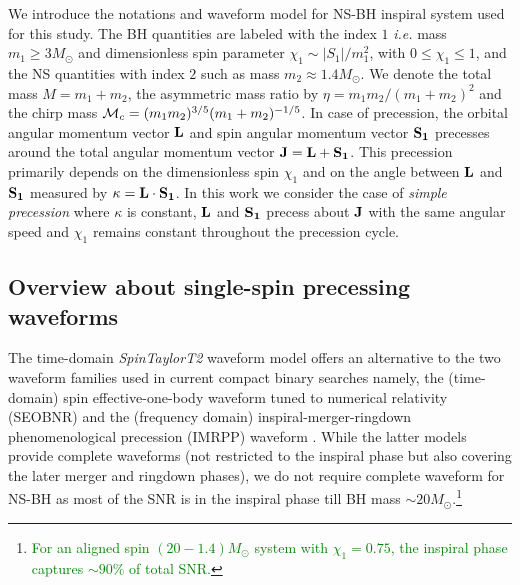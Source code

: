 \documentclass[preprint,onecolumn,,tightenlines,superscriptaddress,showpacs,nofootinbib,eqsecnum,amsfonts,amsmath]{revtex4}
\def\green#1{\textcolor{green}{#1}}
\begin{document}
We introduce the notations and waveform model for NS-BH inspiral system used for
this study. The BH quantities are labeled with the index $1$ {\it i.e.} mass
$m_1 \geq 3 M_\odot$ and dimensionless spin parameter $\chi_1 \sim
|S_1|/{m_1^2}$, with $0 \leq \chi_1 \leq 1$, and the NS quantities with index
$2$ such as mass $m_2 \approx 1.4 M_\odot$. We denote the total mass $M =
m_1+m_2$, the asymmetric mass ratio by $\eta = m_1m_2/(m_1+m_2)^2$ and the chirp
mass ${\cal M}_c=(m_1m_2)^{3/5}(m_1+m_2)^{-1/5}$. In case of precession, the
orbital angular momentum vector $\bf L$ and spin angular momentum vector $\bf
S_1$ precesses around the total angular momentum vector $\bf J = L+S_1$. This
precession primarily depends on the dimensionless spin $\chi_1$ and on the angle
between $\bf L$ and $\bf S_1$ measured by $\kappa = \bf {L} \cdot
{S}_1$. In this work we consider the case of \textit{simple precession}
where $\kappa$ is constant, ${\bf L}$ and ${\bf S_1}$ precess about ${\bf J}$
with the same angular speed and $\chi_1$ remains constant throughout the
precession cycle.
\subsection{Overview about single-spin precessing waveforms}
\label{IIa}

The time-domain \textit{SpinTaylorT2} waveform model offers an alternative to
the two waveform families used in current compact binary searches namely, the
(time-domain) spin effective-one-body waveform tuned to numerical relativity
(SEOBNR) \cite{Taracchini:2013rva} and the (frequency domain)
inspiral-merger-ringdown phenomenological precession (IMRPP) waveform
\cite{Hannam:2013oca}. While the latter models provide complete waveforms (not
restricted to the inspiral phase but also covering the later merger and ringdown
phases), we do not require complete waveform for NS-BH as most of the SNR is in
the inspiral phase till BH mass $\sim 20 M_\odot$.\footnote{\green{For an aligned spin $(20-1.4)M_\odot$ system with $\chi_1=0.75$, the inspiral phase captures $\sim 90\%$ of total SNR.}}
\end{document}
